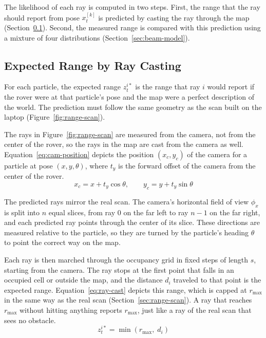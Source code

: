 The likelihood of each ray is computed in two steps. First, the range that the ray should
report from pose $x_t^{[k]}$ is predicted by casting the ray through the map
(Section~\ref{sec:ray-casting}). Second, the measured range is compared with this prediction
using a mixture of four distributions (Section~\ref{sec:beam-model}).

\subsection{Expected Range by Ray Casting}
\label{sec:ray-casting}

For each particle, the expected range $z_t^{i*}$ is the range that ray $i$ would report if the
rover were at that particle's pose and the map were a perfect description of the world. The
prediction must follow the same geometry as the scan built on the laptop
(Figure~\ref{fig:range-scan}).

The rays in Figure~\ref{fig:range-scan} are measured from the camera, not from the center
of the rover, so the rays in the map are cast from the camera as well.
Equation~\ref{eq:cam-position} depicts the position $(x_c, y_c)$ of the camera for a particle
at pose $(x, y, \theta)$, where $t_y$ is the forward offset of the camera from the center of
the rover.
\begin{equation}
  \label{eq:cam-position}
  x_c = x + t_y \cos\theta, \qquad
  y_c = y + t_y \sin\theta
\end{equation}

The predicted rays mirror the real scan. The camera's horizontal field of view $\phi_x$ is
split into $n$ equal slices, from ray $0$ on the far left to ray $n-1$ on the far right, and
each predicted ray points through the center of its slice. These directions are measured
relative to the particle, so they are turned by the particle's heading $\theta$ to point
the correct way on the map.


Each ray is then marched through the occupancy grid in fixed steps of length $s$, starting
from the camera. The ray stops at the first point that falls in an occupied cell or outside
the map, and the distance $d_i$ traveled to that point is the expected range.
Equation~\ref{eq:ray-cast} depicts this range, which is capped at $r_{\max}$ in the same way as
the real scan (Section~\ref{sec:range-scan}). A ray that reaches $r_{\max}$ without hitting anything reports
$r_{\max}$, just like a ray of the real scan that sees no obstacle.
\begin{equation}
  \label{eq:ray-cast}
  z_t^{i*} = \min\left( r_{\max},\; d_i \right)
\end{equation}

